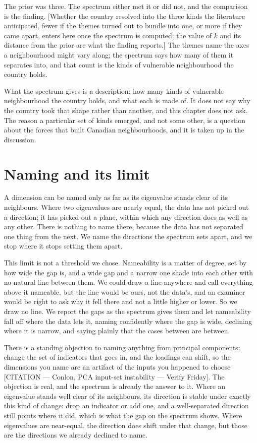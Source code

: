The prior was three. The spectrum either met it or did not, and the comparison is the finding. [Whether the country resolved into the three kinds the literature anticipated, fewer if the themes turned out to bundle into one, or more if they came apart, enters here once the spectrum is computed; the value of $k$ and its distance from the prior are what the finding reports.] The themes name the axes a neighbourhood might vary along; the spectrum says how many of them it separates into, and that count is the kinds of vulnerable neighbourhood the country holds.

What the spectrum gives is a description: how many kinds of vulnerable neighbourhood the country holds, and what each is made of. It does not say why the country took that shape rather than another, and this chapter does not ask. The reason a particular set of kinds emerged, and not some other, is a question about the forces that built Canadian neighbourhoods, and it is taken up in the discussion. 

\section{Naming and its limit}

A dimension can be named only as far as its eigenvalue stands clear of its neighbours. Where two eigenvalues are nearly equal, the data has not picked out a direction; it has picked out a plane, within which any direction does as well as any other. There is nothing to name there, because the data has not separated one thing from the next. We name the directions the spectrum sets apart, and we stop where it stops setting them apart.

This limit is not a threshold we chose. Nameability is a matter of degree, set by how wide the gap is, and a wide gap and a narrow one shade into each other with no natural line between them. We could draw a line anywhere and call everything above it nameable, but the line would be ours, not the data's, and an examiner would be right to ask why it fell there and not a little higher or lower. So we draw no line. We report the gaps as the spectrum gives them and let nameability fall off where the data lets it, naming confidently where the gap is wide, declining where it is narrow, and saying plainly that the cases between are between.

There is a standing objection to naming anything from principal components: change the set of indicators that goes in, and the loadings can shift, so the dimensions you name are an artifact of the inputs you happened to choose [CITATION — Conlon, PCA input-set instability — Verify Friday]. The objection is real, and the spectrum is already the answer to it. Where an eigenvalue stands well clear of its neighbours, its direction is stable under exactly this kind of change: drop an indicator or add one, and a well-separated direction still points where it did, which is what the gap on the spectrum shows. Where eigenvalues are near-equal, the direction does shift under that change, but those are the directions we already declined to name.

